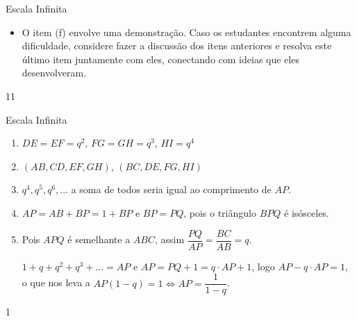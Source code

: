 \begin{sugestions}{Escala Infinita}
{
\begin{itemize}
\item O item (f) envolve uma demonstração. Caso os estudantes encontrem alguma dificuldade, considere fazer a discussão dos itens anteriores e resolva este último item juntamente com eles, conectando com ideias que eles desenvolveram.

\end{itemize}
}{1}{1}
\end{sugestions}
\begin{answer}{Escala Infinita}
{
\begin{enumerate}
\item $DE=EF=q^2$, $FG=GH=q^3$, $HI=q^4$
\item $(AB, CD, EF, GH)$, $(BC, DE, FG, HI)$
\item $q^4, q^5, q^6,... $ a soma de todos seria igual ao comprimento de $AP$.
\item $AP=AB+BP=1+BP$ e $BP=PQ$, pois o triângulo $BPQ$ é isósceles.
\item Pois $APQ$ é semelhante a $ABC$, assim $\dfrac{PQ}{AP}=\dfrac{BC}{AB}=q$.

$ 1+q+q^2+q^3+...= AP $ e $AP= PQ+1 = q\cdot AP +1$, logo $AP-q\cdot AP=1$, o que nos leva a $AP(1-q)=1 \iff AP=\dfrac 1{1-q}$.
\end{enumerate}
}{1}
\end{answer}


